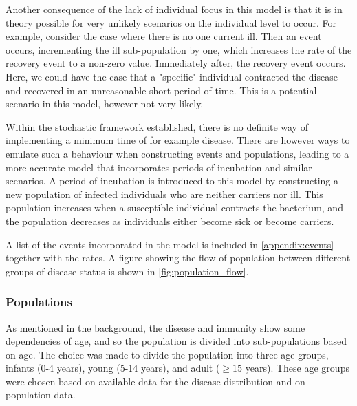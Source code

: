 \documentclass[10pt,a4paper]{article}
\begin{document}
Another consequence of the lack of individual focus in this model is that it is in theory possible for very unlikely scenarios on the individual level to occur. For example, consider the case where there is no one current ill. Then an event occurs, incrementing the ill sub-population by one, which increases the rate of the recovery event to a non-zero value. Immediately after, the recovery event occurs. Here, we could have the case that a "specific" individual contracted the disease and recovered in an unreasonable short period of time. This is a potential scenario in this model, however not very likely.

Within the stochastic framework established, there is no definite way of implementing a minimum time of for example disease. There are however ways to emulate such a behaviour when constructing events and populations, leading to a more accurate model that incorporates periods of incubation and similar scenarios. A period of incubation is introduced to this model by constructing a new population of infected individuals who are neither carriers nor ill. This population increases when a susceptible individual contracts the bacterium, and the population decreases as individuals either become sick or become carriers.

A list of the events incorporated in the model is included in \cref{appendix:events} together with the rates. A figure showing the flow of population between different groups of disease status is shown in \cref{fig:population_flow}.




\subsubsection{Populations}

As mentioned in the background, the disease and immunity show some dependencies of age, and so the population is divided into sub-populations based on age. The choice was made to divide the population into three age groups, infants (0-4 years), young (5-14 years), and adult ($\geq15$ years). These age groups were chosen based on available data for the disease distribution and on population data.
\end{document}

